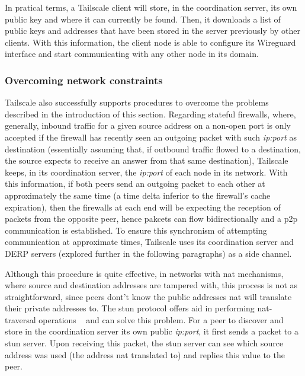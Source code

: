\documentclass[11pt,twoside,a4paper]{report}
\begin{document}
In pratical terms, a Tailscale client will store, in the coordination server, its own public key and where it can currently be found. Then, it downloads a list of public keys and addresses that have been stored in the server previously by other clients. With this information, the client node is able to configure its Wireguard interface and start communicating with any other node in its domain.

\subsubsection{Overcoming network constraints}

Tailscale also successfully supports procedures to overcome the problems described in the introduction of this section. Regarding stateful firewalls, where, generally, inbound traffic for a given source address on a non-open port is only accepted if the firewall has recently seen an outgoing packet with such \emph{ip:port} as destination (essentially assuming that, if outbound traffic flowed to a destination, the source expects to receive an answer from that same destination), Tailscale keeps, in its coordination server, the \emph{ip:port} of each node in its network. With this information, if both peers send an outgoing packet to each other at approximately the same time (a time delta inferior to the firewall's cache expiration), then the firewalls at each end will be expecting the reception of packets from the opposite peer, hence pakcets can flow bidirectionally and a \acrshort{p2p} communication is established. To ensure this synchronism of attempting communication at approximate times, Tailscale uses its coordination server and \acrshort{DERP} servers (explored further in the following paragraphs) as a side channel.

Although this procedure is quite effective, in networks with \acrshort{nat} mechanisms, where source and destination addresses are tampered with, this process is not as straightforward, since peers dont't know the public addresses \acrshort{nat} will translate their private addresses to. The \acrshort{stun} protocol offers aid in performing \acrshort{nat}-traversal operations ~\cite{rfc8489} and can solve this problem. For a peer to discover and store in the coordination server its own public \emph{ip:port}, it first sends a packet to a \acrshort{stun} server. Upon receiving this packet, the \acrshort{stun} server can see which source address was used (the address \acrshort{nat} translated to) and replies this value to the peer.
\end{document}
